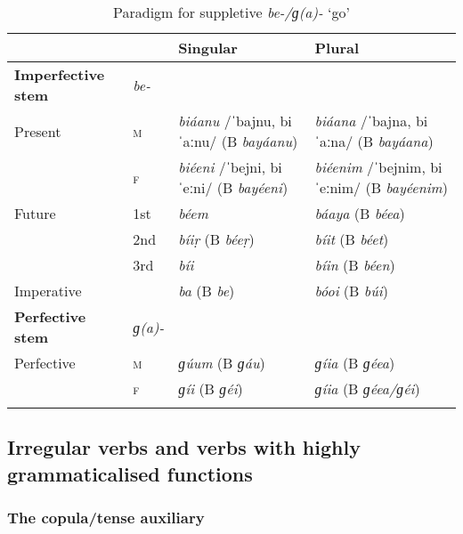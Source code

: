 \begin{table}[ht]
\caption{Paradigm for suppletive \textit{be-/ɡ(a)-} `go'}

\begin{tabularx}{\textwidth}{ l@{\hspace{20pt}} l@{\hspace{20pt}} Q Q }
\lsptoprule
&
&
Singular &
Plural\\\midrule
\textbf{Imperfective stem} &
\textit{be-} &
&
\\
Present &
\textsc{m} &
\textit{biáanu} /ˈbajnu, biˈaːnu/\newline
(B \textit{bayáanu}) &
\textit{biáana} /ˈbajna, biˈaːna/\newline
(B \textit{bayáana})\\
&
\textsc{f} &
\textit{biéeni} /ˈbejni, biˈeːni/\newline
(B \textit{bayéeni}) &
\textit{biéenim} /ˈbejnim, biˈeːnim/ \newline
(B \textit{bayéenim})\\
Future &
1st &
\textit{béem} &
\textit{báaya} (B \textit{béea})\\
&
2nd &
\textit{bíiṛ} (B \textit{béeṛ}) &
\textit{bíit} (B \textit{béet})\\
&
3rd &
\textit{bíi} &
\textit{bíin} (B \textit{béen})\\
Imperative &
&
\textit{ba} (B \textit{be}) &
\textit{bóoi} (B \textit{búi})\\
\textbf{Perfective stem} &
\textit{ɡ(a)-} &
&
\\
Perfective &
\textsc{m} &
\textit{ɡúum} (B \textit{ɡáu}) &
\textit{ɡíia} (B \textit{ɡéea})\\
&
\textsc{f} &
\textit{ɡíi} (B \textit{ɡéi}) &
\textit{ɡíia} (B \textit{ɡéea/ɡéi})\\\lspbottomrule
\end{tabularx}
\label{tab:8-13}
\end{table}



\subsection{Irregular verbs and verbs with highly grammaticalised functions}
\label{subsec:8-3-12}

\subsubsection*{The copula/tense auxiliary}

